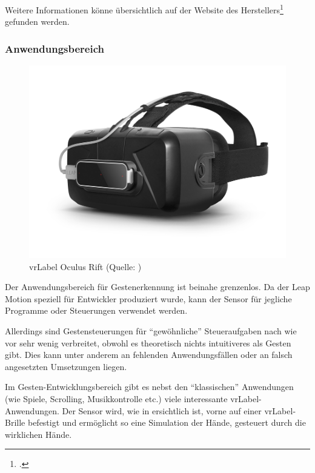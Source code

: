 Weitere Informationen könne übersichtlich auf der Website des Herstellers\footcite{Leap_Motion_Motion_Controller_2015-03-27} gefunden werden.

\subsubsection{Anwendungsbereich}
\begin{figure}
	\includegraphics[width=1.0\linewidth]{images/analysis/leap_vr.png}
	\caption[Oculus Rift VR]{\acrshort{vrLabel} Oculus Rift (Quelle: )}
	\label{fig:leap_vr}
\end{figure}
Der Anwendungsbereich für Gestenerkennung ist beinahe grenzenlos.
Da der Leap Motion speziell für Entwickler produziert wurde, kann der Sensor für jegliche Programme oder Steuerungen verwendet werden.

Allerdings sind Gestensteuerungen für "`gewöhnliche"' Steueraufgaben nach wie vor sehr wenig verbreitet, obwohl es theoretisch nichts intuitiveres als Gesten gibt.
Dies kann unter anderem an fehlenden Anwendungsfällen oder an falsch angesetzten Umsetzungen liegen.

Im Gesten-Entwicklungsbereich gibt es nebst den "`klassischen"' Anwendungen (wie Spiele, Scrolling, Musikkontrolle etc.) viele interessante  \gls{vrLabel}-Anwendungen. Der Sensor wird, wie in  ersichtlich ist, vorne auf einer \gls{vrLabel}-Brille befestigt und ermöglicht so eine Simulation der Hände, gesteuert durch die wirklichen Hände.


